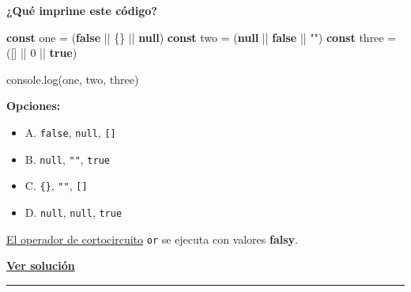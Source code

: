 \documentclass[
  letterpaper,
  DIV=11,
  numbers=noendperiod]{scrreprt}
\newenvironment{Shaded}{\begin{snugshade}}{\end{snugshade}}
\newcommand{\BuiltInTok}[1]{\textcolor[rgb]{0.00,0.23,0.31}{#1}}
\newcommand{\DecValTok}[1]{\textcolor[rgb]{0.68,0.00,0.00}{#1}}
\newcommand{\FunctionTok}[1]{\textcolor[rgb]{0.28,0.35,0.67}{#1}}
\newcommand{\KeywordTok}[1]{\textcolor[rgb]{0.00,0.23,0.31}{\textbf{#1}}}
\newcommand{\NormalTok}[1]{\textcolor[rgb]{0.00,0.23,0.31}{#1}}
\newcommand{\OperatorTok}[1]{\textcolor[rgb]{0.37,0.37,0.37}{#1}}
\newcommand{\StringTok}[1]{\textcolor[rgb]{0.13,0.47,0.30}{#1}}
\providecommand{\tightlist}{%
  \setlength{\itemsep}{0pt}\setlength{\parskip}{0pt}}
\begin{document}
\textbf{¿Qué imprime este código?}

\begin{Shaded}
\begin{Highlighting}[]
\KeywordTok{const}\NormalTok{ one }\OperatorTok{=}\NormalTok{ (}\KeywordTok{false} \OperatorTok{||}\NormalTok{ \{\} }\OperatorTok{||} \KeywordTok{null}\NormalTok{)}
\KeywordTok{const}\NormalTok{ two }\OperatorTok{=}\NormalTok{ (}\KeywordTok{null} \OperatorTok{||} \KeywordTok{false} \OperatorTok{||} \StringTok{""}\NormalTok{)}
\KeywordTok{const}\NormalTok{ three }\OperatorTok{=}\NormalTok{ ([] }\OperatorTok{||} \DecValTok{0} \OperatorTok{||} \KeywordTok{true}\NormalTok{)}

\BuiltInTok{console}\OperatorTok{.}\FunctionTok{log}\NormalTok{(one}\OperatorTok{,}\NormalTok{ two}\OperatorTok{,}\NormalTok{ three)}
\end{Highlighting}
\end{Shaded}

\textbf{Opciones:}

\begin{itemize}
\tightlist
\item
  A. \texttt{false}, \texttt{null}, \texttt{{[}{]}}
\item
  B. \texttt{null}, \texttt{""}, \texttt{true}
\item
  C. \texttt{\{\}}, \texttt{""}, \texttt{{[}{]}}
\item
  D. \texttt{null}, \texttt{null}, \texttt{true}
\end{itemize}

\begin{tcolorbox}[enhanced jigsaw, left=2mm, toprule=.15mm, leftrule=.75mm, breakable, colback=white, coltitle=black, bottomtitle=1mm, arc=.35mm, rightrule=.15mm, colframe=quarto-callout-tip-color-frame, opacitybacktitle=0.6, toptitle=1mm, opacityback=0, titlerule=0mm, title=\textcolor{quarto-callout-tip-color}{\faLightbulb}\hspace{0.5em}{Pista}, bottomrule=.15mm, colbacktitle=quarto-callout-tip-color!10!white]

\hyperref[glos-corto_circuito]{El operador de cortocircuito} \texttt{or}
se ejecuta con valores \textbf{falsy}.

\end{tcolorbox}

\textbf{\hyperref[sec-sol-cap1-reto8]{Ver solución}}

\begin{center}\rule{0.5\linewidth}{0.5pt}\end{center}
\end{document}
